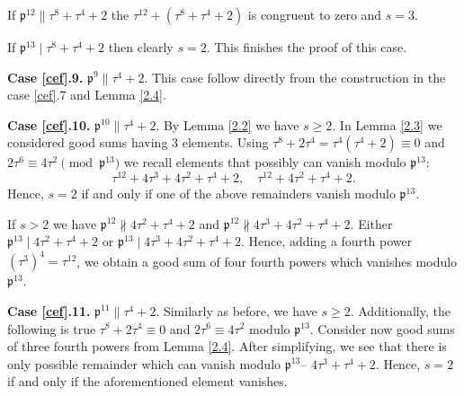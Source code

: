 \documentclass[12pt]{article}
\theoremstyle{remark}
\newcommand{\p}{\mathfrak{p}}
\begin{document}
If $\mathfrak{p}^{12} \parallel \tau^8+\tau^4+2$ the $\tau^{12}+ (\tau^8+\tau^4+2)$
is congruent to zero and $s=3$.

If $\mathfrak{p}^{13} \mid \tau^8+\tau^4+2$ then clearly $s=2$. This finishes the proof of this case.



\textbf{Case \ref{cef}.9.} $\mathfrak{p}^9 \parallel \tau^4+2$. 
This case follow directly from the construction in the case \ref{cef}.7 and Lemma \ref{2.4}.



\textbf{Case \ref{cef}.10.} $\mathfrak{p}^{10} \parallel \tau^4+2$. By Lemma \ref{2.2} we have $s \geq 2$. In Lemma \ref{2.3} we considered good sums having 3 elements. Using $\tau^8+2\tau^4 = \tau^4(\tau^4+2) \equiv 0$ and $2\tau^6 \equiv 4\tau^2 \pmod{\mathfrak{p}^{13}}$ we recall elements that possibly can vanish modulo $\p^{13}$:
\[\tau^{12}+4\tau^3+4\tau^2+\tau^4+2, \quad \tau^{12}+4\tau^2+\tau^4+2.\]
Hence, $s=2$ if and only if one of the above remainders vanish modulo $\p^{13}$.


If $s>2$ we have $\mathfrak{p}^{12} \not\parallel 4\tau^2+\tau^4+2$ and $\mathfrak{p}^{12} \not\parallel 4\tau^3+4\tau^2+\tau^4+2$. Either $\mathfrak{p}^{13} \mid 4\tau^2+\tau^4+2$ or $\mathfrak{p}^{13} \mid 4\tau^3+4\tau^2+\tau^4+2$. Hence, adding a fourth power $(\tau^3)^4 = \tau^{12}$, we obtain a good sum of four fourth powers which vanishes modulo $\mathfrak{p}^{13}$. 


\textbf{Case \ref{cef}.11.} $\mathfrak{p}^{11} \parallel \tau^4+2$. Similarly as before, we have $s \geq 2$. Additionally, the following is true $\tau^8+2\tau^4 \equiv 0$ and $2\tau^6 \equiv 4\tau^2$ modulo $\mathfrak{p}^{13}$. Consider now good sums of three fourth powers from Lemma \ref{2.4}. After simplifying, we see that there is only possible remainder which can vanish modulo $\p^{13}$-- $4\tau^3+\tau^4+2$.  Hence, $s=2$ if and only if the aforementioned element vanishes. 
\end{document}
